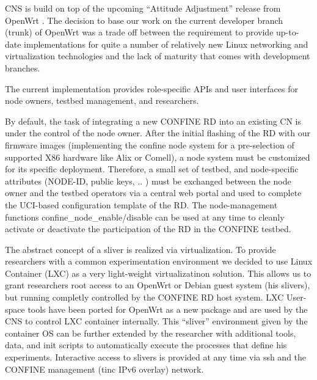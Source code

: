 \documentclass[conference]{IEEEtran}
\begin{document}
CNS is build on top of the upcoming ``Attitude Adjustment'' release
from OpenWrt \cite{attitudeAdjustment}. The decision to base our work
on the current developer branch (trunk) of OpenWrt was a trade off
between the requirement to provide up-to-date implementations for
quite a number of relatively new Linux networking and virtualization
technologies and the lack of maturity that comes with development
branches. 

The current implementation provides role-specific APIs and user
interfaces for node owners, testbed management, and researchers.

By default, the task of integrating a new CONFINE RD into an existing
CN is under the control of the node owner.  After the initial flashing
of the RD with our firmware images (implementing the confine node
system for a pre-selection of supported X86 hardware like Alix or
Comell), a node system must be customized for its specific deployment.
Therefore, a small set of testbed, and node-specific attributes
(NODE-ID, public keys, .. ) must be exchanged between the node owner
and the testbed operators via a central web portal and used to
complete the UCI-based configuration template of the RD.  The
node-management functions confine\_node\_enable/disable can be used at
any time to cleanly activate or deactivate the participation of the RD
in the CONFINE testbed.

The abstract concept of a sliver is realized via virtualization.  To
provide researchers with a common experimentation environment we
decided to use Linux Container (LXC) as a very light-weight
virtualizatinon solution. This allows us to grant researchers root
access to an OpenWrt or Debian guest system (his slivers), but running
completly controlled by the CONFINE RD host system. LXC User-space
tools have been ported for OpenWrt as a new package and are used by
the CNS to control LXC container internally. This ``sliver''
environment given by the container OS can be further extended by the
researcher with additional tools, data, and init scripts to
automatically execute the processes that define his experiments.
Interactive access to slivers is provided at any time via ssh and the
CONFINE management (tinc IPv6 overlay) network.
\end{document}
